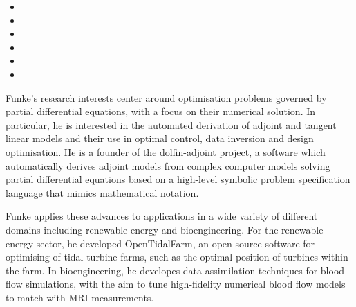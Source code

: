 \documentclass[11pt]{article}
\newenvironment{outerlist}[1][\enskip\textbullet]
        {\begin{itemize}[ #1]}{\end{itemize}}
\begin{document}
\begin{outerlist}
\item[] 
\item[] 
\item [] 
\item [] 
\item[] 
\item[] 
\end{outerlist}


Funke's research interests center around optimisation problems governed by
partial differential equations, with a focus on their numerical solution. In
particular, he is interested in the automated derivation of adjoint and tangent
linear models and their use in optimal control, data inversion and design optimisation.
He is a founder of the dolfin-adjoint project, a software which automatically
derives adjoint models from complex computer models solving partial
differential equations based on a high-level symbolic problem specification
language that mimics mathematical notation.

Funke applies these advances to applications in a wide variety of different
domains including renewable energy and bioengineering. For the renewable energy
sector, he developed OpenTidalFarm, an open-source software for optimising of
tidal turbine farms, such as the optimal position of turbines within the farm.
In bioengineering, he developes data assimilation techniques for blood flow
simulations, with the aim to tune high-fidelity numerical blood flow models to
match with MRI measurements.
\end{document}
